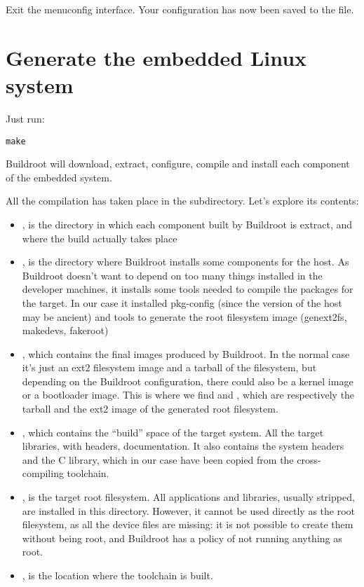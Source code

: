 Exit the menuconfig interface. Your configuration has now been saved
to the  file.


\section{Generate the embedded Linux system}

Just run:

\begin{verbatim}
make
\end{verbatim}

Buildroot will download, extract, configure, compile and install each
component of the embedded system.

All the compilation has taken place in the  subdirectory. Let's
explore its contents:

\begin{itemize}

\item {}, is the directory in which each component built by
  Buildroot is extract, and where the build actually takes place

\item {}, is the directory where Buildroot installs some
  components for the host. As Buildroot doesn't want to depend on too
  many things installed in the developer machines, it installs some
  tools needed to compile the packages for the target. In our case it
  installed pkg-config (since the version of the host may be ancient)
  and tools to generate the root filesystem image (genext2fs,
  makedevs, fakeroot)

\item {}, which contains the final images produced by
  Buildroot. In the normal case it's just an ext2 filesystem image and a
  tarball of the filesystem, but depending on the Buildroot
  configuration, there could also be a kernel image or a bootloader
  image. This is where we find  and
  , which are respectively the tarball and the ext2
  image of the generated root filesystem.

\item {}, which contains the “build” space of the target
  system. All the target libraries, with headers, documentation. It
  also contains the system headers and the C library, which in our
  case have been copied from the cross-compiling toolchain.

\item {}, is the target root filesystem. All applications
  and libraries, usually stripped, are installed in this
  directory. However, it cannot be used directly as the root
  filesystem, as all the device files are missing: it is not possible
  to create them without being root, and Buildroot has a policy of not
  running anything as root.

\item {}, is the location where the toolchain is
  built.

\end{itemize}

